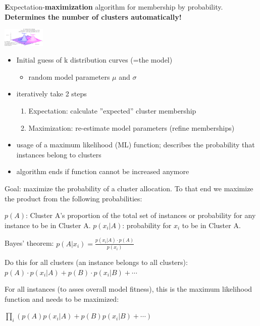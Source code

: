 \begin{breakbox}

\textbf{E}xpectation-\textbf{maximization} algorithm for membership by probability. \textbf{Determines the number of clusters automatically!}

\begin{center}
	\includegraphics[width=0.15\textwidth]{slides_images/membership_by_probability_em}
\end{center}

\begin{itemize}
	\item Initial guess of k distribution curves (=the model)
		\begin{itemize}
			\item random model parameters $\mu$ and $\sigma$
		\end{itemize}
	\item iteratively take 2 steps
		\begin{enumerate}
			\item Expectation: calculate ''expected'' cluster membership
			\item Maximization: re-estimate model parameters (refine memberships)
		\end{enumerate}
	\item usage of a maximum likelihood (ML) function; describes the probability that instances belong to clusters
	\item algorithm ends if function cannot be increased anymore
\end{itemize}

Goal: maximize the probability of a cluster allocation. To that end we maximize the product from the following probabilities:
\begin{itemize}
	$p(A)$: Cluster A's proportion of the total set of instances or probability for any instance to be in Cluster A.
	$p(x_i|A)$: probability for $x_i$ to be in Cluster A.
\end{itemize}

Bayes' theorem: $p(A|x_i) = \frac{p(x_i|A) \cdot p(A)}{p(x_i)}$

Do this for all clusters (an instance belongs to all clusters): $p(A) \cdot p(x_i|A) + p(B) \cdot p(x_i|B) + \cdots$

For all instances (to asses overall model fitness), this is the maximum likelihood function and needs to be maximized:
\begin{center}
	$\prod_{i}{}(p(A) p(x_i|A) + p(B) p(x_i|B) + \cdots)$
\end{center}


\end{breakbox}
